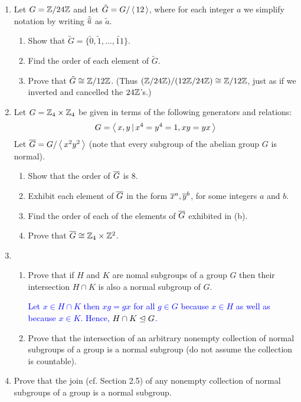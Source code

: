 \documentclass[10pt,a4paper]{report}
\newcommand{\BLUE}[1]{\textcolor{blue}{#1}}
\begin{document}
\begin{enumerate}
	\item Let $G=\mathbb{Z}/24\mathbb{Z}$ and let $\tilde{G} = G/\left \langle\, 12 \,\right \rangle$, where for each integer $a$ we simplify notation by writing $\tilde{\overline{a}}$ as $\tilde{a}$.
	\begin{enumerate}
		\item Show that $\tilde{G}= \{\tilde{0},\tilde{1}, \dots, \tilde{11}\}$.
		\item Find the order of each element of $\tilde{G}$.
		\item Prove that $\tilde{G}\cong \mathbb{Z}/12\mathbb{Z}$.  (Thus $(\mathbb{Z}/24\mathbb{Z})/(12\mathbb{Z}/24\mathbb{Z})\cong\mathbb{Z}/12\mathbb{Z} $, just as if we inverted and cancelled the $24\mathbb{Z}$'s.)
	\end{enumerate}
	
	\item Let $G= \mathbb{Z}_4 \times \mathbb{Z}_4$ be given in terms of the following generators and relations:
	\begin{align*}
		G = \left \langle\, x,y\,|\,x^4=y^4=1, xy=yx \,\right \rangle
	\end{align*}Let $\overline{G}=G/\left \langle\, x^2y^2 \,\right \rangle$ (note that every subgroup of the abelian group $G$ is normal).
	\begin{enumerate}
		\item Show that the order of $\overline{G}$ is 8.
		\item Exhibit each element of $\overline{G}$ in the form $\overline{x}^a,\overline{y}^b$, for some integers $a$ and $b$.
		\item Find the order of each of the elements of $\overline{G}$ exhibited in (b).
		\item Prove that $\overline{G}\cong \mathbb{Z}_4 \times \mathbb{Z}^2$.
	\end{enumerate}
	
	\item \begin{enumerate}
		\item Prove that if $H$ and $K$ are nomal subgroups of a group $G$ then their intersection $H \cap K$ is also a normal subgroup of $G$.
		
		\BLUE{Let $x \in H \cap K$ then $xg = gx$ for all $g \in G$ because $x \in H$ as well as because $x \in K$.  Hence, $H\cap K \trianglelefteq G$.
		}
		
		\item Prove that the intersection of an arbitrary nonempty collection of normal subgroups of a group is a normal subgroup (do not assume the collection is countable).
	\end{enumerate}
	
	\item Prove that the join (cf. Section 2.5) of any nonempty collection of normal subgroups of a group is a normal subgroup.
	

\end{enumerate}
\end{document}
